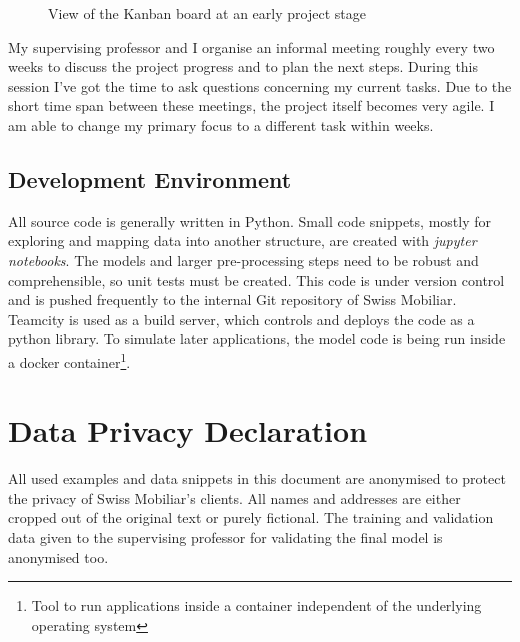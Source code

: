\begin{figure}[!ht]
\centering
{}
\caption{View of the Kanban board at an early project stage}
\label{fig:kanban}
\end{figure}

My supervising professor and I organise an informal meeting roughly every two weeks to discuss the project progress and to plan the next steps. During this session I've got the time to ask questions concerning my current tasks. Due to the short time span between these meetings, the project itself becomes very agile. I am able to change my primary focus to a different task within weeks.

\subsection{Development Environment}

All source code is generally written in Python. Small code snippets, mostly for exploring and mapping data into another structure, are created with \emph{jupyter notebooks}. The models and larger pre-processing steps need to be robust and comprehensible, so unit tests must be created. This code is under version control and is pushed frequently to the internal Git repository of Swiss Mobiliar. Teamcity is used as a build server, which controls and deploys the code as a python library. To simulate later applications, the model code is being run inside a docker container\footnote{Tool to run applications inside a container independent of the underlying operating system}.

\section{Data Privacy Declaration}

All used examples and data snippets in this document are anonymised to protect the privacy of Swiss Mobiliar's clients. All names and addresses are either cropped out of the original text or purely fictional. The training and validation data given to the supervising professor for validating the final model is anonymised too.
